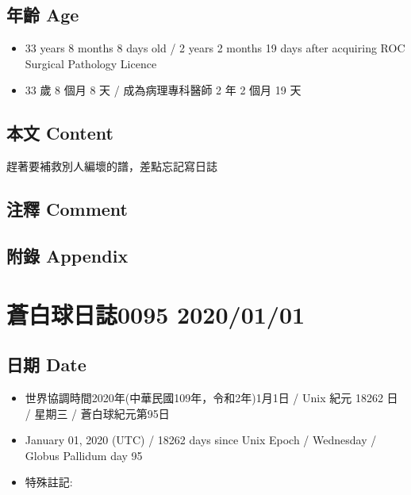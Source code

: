 \documentclass[
]{article}
\providecommand{\tightlist}{%
  \setlength{\itemsep}{0pt}\setlength{\parskip}{0pt}}
\begin{document}
\hypertarget{ux5e74ux9f61-age-30}{%
\subsection{年齡 Age}\label{ux5e74ux9f61-age-30}}

\begin{itemize}
\tightlist
\item
  33 years 8 months 8 days old / 2 years 2 months 19 days after
  acquiring ROC Surgical Pathology Licence
\item
  33 歲 8 個月 8 天 / 成為病理專科醫師 2 年 2 個月 19 天
\end{itemize}

\hypertarget{ux672cux6587-content-30}{%
\subsection{本文 Content}\label{ux672cux6587-content-30}}

趕著要補救別人編壞的譜，差點忘記寫日誌

\hypertarget{ux6ce8ux91cb-comment-29}{%
\subsection{注釋 Comment}\label{ux6ce8ux91cb-comment-29}}

\hypertarget{ux9644ux9304-appendix-30}{%
\subsection{附錄 Appendix}\label{ux9644ux9304-appendix-30}}

\hypertarget{ux84bcux767dux7403ux65e5ux8a8c0095-20200101}{%
\section{蒼白球日誌0095
2020/01/01}\label{ux84bcux767dux7403ux65e5ux8a8c0095-20200101}}

\hypertarget{ux65e5ux671f-date-31}{%
\subsection{日期 Date}\label{ux65e5ux671f-date-31}}

\begin{itemize}
\tightlist
\item
  世界協調時間2020年(中華民國109年，令和2年)1月1日 / Unix 紀元 18262 日
  / 星期三 / 蒼白球紀元第95日
\item
  January 01, 2020 (UTC) / 18262 days since Unix Epoch / Wednesday /
  Globus Pallidum day 95
\item
  特殊註記:
\end{itemize}
\end{document}
